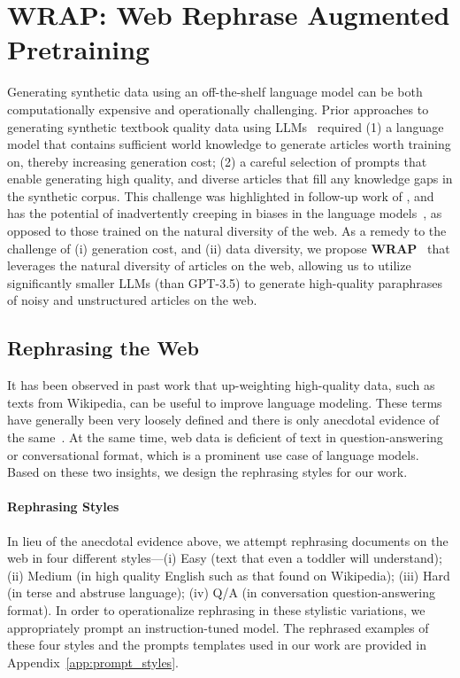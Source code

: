 \documentclass[table]{article}
\newcommand{\ours}{\textbf{WRAP}}
\begin{document}
\section{\ours: Web Rephrase Augmented Pretraining}
Generating synthetic data using an off-the-shelf language model can be both computationally expensive and operationally challenging. Prior approaches to generating synthetic textbook quality data using LLMs~\citep{gunasekar2023textbooks} required (1) a language model that contains sufficient world knowledge to generate articles worth training on, thereby increasing generation cost; (2) a careful selection of prompts that enable generating high quality, and diverse articles that fill any knowledge gaps in the synthetic corpus. This challenge was highlighted in follow-up work of \citet{li2023textbooks}, and has the potential of inadvertently creeping in biases in the language models~\citep{maini_phi_1_5}, as opposed to those trained on the natural diversity of the web.
As a remedy to the challenge of (i) generation cost, and (ii) data diversity, we propose \ours~ that leverages the natural diversity of articles on the web, allowing us to utilize significantly smaller LLMs (than GPT-3.5) to generate high-quality paraphrases of noisy and unstructured articles on the web.

\subsection{Rephrasing the Web}
\label{sec:synthetic_data_generation}
It has been observed in past work that up-weighting high-quality data, such as texts from Wikipedia, can be useful to improve language modeling. These terms have generally been very loosely defined and there is only anecdotal evidence of the same~\citep{brown2020language,wenzek-etal-2020-ccnet}. At the same time, web data is deficient of text in question-answering or conversational format, which is a prominent use case of language models. Based on these two insights, we design the rephrasing styles for our work.

\paragraph{Rephrasing Styles}
In lieu of the anecdotal evidence above, we attempt rephrasing documents on the web in four different styles---(i) Easy (text that even a toddler will understand); (ii) Medium (in high quality English such as that found on Wikipedia); (iii) Hard (in terse and abstruse language); (iv) Q/A (in conversation question-answering format). In order to operationalize rephrasing in these stylistic variations, we appropriately prompt an instruction-tuned model. The rephrased examples of these four styles and the prompts templates used in our work are provided in Appendix~\ref{app:prompt_styles}.
\end{document}

